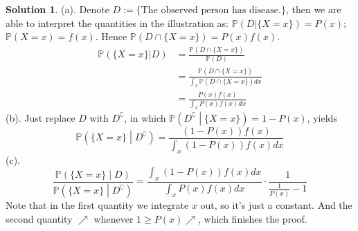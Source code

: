 \documentclass[a4paper, 10pt]{article}
\theoremstyle{definition}
\theoremstyle{hSol}
\newtheorem*{solution}{Solution}
\begin{document}
\begin{solution} (a). Denote $D:=\{\text{The observed person has disease.}\}$, then we are able to interpret the quantities in the illustration as: $\mathbb{P}\left(D|\{X=x\}\right)=P(x)$; $\mathbb{P}\left(X=x\right)=f(x)$. Hence $\mathbb{P}\left(D\cap\{X=x\}\right)=P(x)f(x)$.
\begin{equation}
  \begin{split}
    \mathbb{P}\left(\{X=x\}|D\right) &= \frac{\mathbb{P}\left(D\cap\{X=x\}\right)}{\mathbb{P}\left(D\right)}\\
    &= \frac{\mathbb{P}\left(D\cap\{X=x\}\right)}{\int_x \mathbb{P}\left(D\cap\{X=x\}\right) dx}\\
    &= \frac{P(x)f(x)}{\int_x P(x)f(x)dx}
  \end{split}
\end{equation}
(b). Just replace $D$ with $D^{\complement}$, in which $\mathbb{P}\left(D^{\complement}\middle|\{X=x\}\right)=1-P(x)$, yields
\begin{equation}
  \mathbb{P}\left(\{X=x\}\middle|D^{\complement}\right) = \frac{(1-P(x))f(x)}{\int_x (1-P(x))f(x)dx}
\end{equation}
(c). 
\begin{equation}
  \frac{\mathbb{P}\left(\{X=x\}\middle|D\right)}{\mathbb{P}\left(\{X=x\}\middle|D^{\complement}\right)} = \frac{\int_x (1-P(x))f(x)dx}{\int_x P(x)f(x)dx} \cdot \frac{1}{\frac{1}{P(x)}-1}
\end{equation}
Note that in the first quantity we integrate $x$ out, so it's just a constant. And the second quantity $\nearrow$ whenever $1\geq P(x) \nearrow$, which finishes the proof.
\end{solution}
\end{document}
